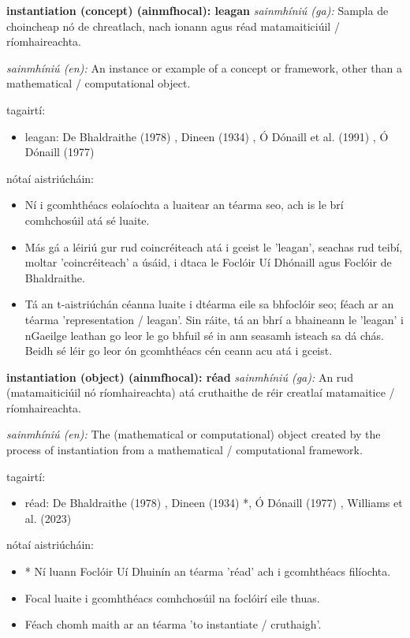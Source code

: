 \documentclass{article}
\begin{document}
\textbf{instantiation (concept) (ainmfhocal): leagan}
\textit{sainmhíniú (ga):} Sampla de choincheap nó de chreatlach, nach ionann agus réad matamaiticiúil / ríomhaireachta.

\textit{sainmhíniú (en):} An instance or example of a concept or framework, other than a mathematical / computational object.

tagairtí:
\begin{itemize}
	\item leagan: De Bhaldraithe (1978) \cite{de-bhaldraithe}, Dineen (1934) \cite{dineen}, Ó Dónaill et al. (1991) \cite{focloir-beag}, Ó Dónaill (1977) \cite{odonaill}
\end{itemize}

nótaí aistriúcháin:
\begin{itemize}
	\item Ní i gcomhthéacs eolaíochta a luaitear an téarma seo, ach is le brí comhchosúil atá sé luaite.
	\item Más gá a léiriú gur rud coincréiteach atá i gceist le 'leagan', seachas rud teibí, moltar 'coincréiteach' a úsáid, i dtaca le Foclóir Uí Dhónaill agus Foclóir de Bhaldraithe.
	\item Tá an t-aistriúchán céanna luaite i dtéarma eile sa bhfoclóir seo; féach ar an téarma 'representation / leagan'. Sin ráite, tá an bhrí a bhaineann le 'leagan' i nGaeilge leathan go leor le go bhfuil sé in ann seasamh isteach sa dá chás. Beidh sé léir go leor ón gcomhthéacs cén ceann acu atá i gceist.
\end{itemize}


\textbf{instantiation (object) (ainmfhocal): réad}
\textit{sainmhíniú (ga):} An rud (matamaiticiúil nó ríomhaireachta) atá cruthaithe de réir creatlaí matamaitice / ríomhaireachta.

\textit{sainmhíniú (en):} The (mathematical or computational) object created by the process of instantiation from a mathematical / computational framework.

tagairtí:
\begin{itemize}
	\item réad: De Bhaldraithe (1978) \cite{de-bhaldraithe}, Dineen (1934) \cite{dineen}*, Ó Dónaill (1977) \cite{odonaill}, Williams et al. (2023) \cite{storchiste}
\end{itemize}

nótaí aistriúcháin:
\begin{itemize}
	\item * Ní luann Foclóir Uí Dhuinín an téarma 'réad' ach i gcomhthéacs filíochta.
	\item Focal luaite i gcomhthéacs comhchosúil na foclóirí eile thuas.
	\item Féach chomh maith ar an téarma 'to instantiate / cruthaigh'.
\end{itemize}
\end{document}
